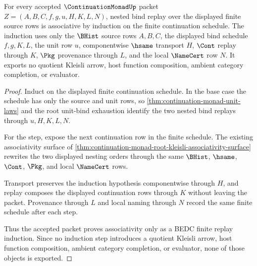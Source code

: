 \begin{theorem}
\label{thm:continuation-monad-bhist-bind-associativity-induction}
For every accepted $\ContinuationMonadUp$ packet $Z=(A,B,C,f,g,u,H,K,L,N)$, nested bind replay over the displayed finite source rows is associative by induction on the finite continuation schedule. The induction uses only the $\BHist$ source rows $A,B,C$, the displayed bind schedule $f,g,K,L$, the unit row $u$, componentwise $\hsame$ transport $H$, $\Cont$ replay through $K$, $\Pkg$ provenance through $L$, and the local $\NameCert$ row $N$. It exports no quotient Kleisli arrow, host function composition, ambient category completion, or evaluator.
\end{theorem}
\begin{proof}
Induct on the displayed finite continuation schedule. In the base case the schedule has only the source and unit rows, so \autoref{thm:continuation-monad-unit-laws} and the root unit-bind exhaustion identify the two nested bind replays through $u,H,K,L,N$.

For the step, expose the next continuation row in the finite schedule. The existing associativity surface of \autoref{thm:continuation-monad-root-kleisli-associativity-surface} rewrites the two displayed nesting orders through the same $\BHist$, $\hsame$, $\Cont$, $\Pkg$, and local $\NameCert$ rows.

Transport preserves the induction hypothesis componentwise through $H$, and replay composes the displayed continuation rows through $K$ without leaving the packet. Provenance through $L$ and local naming through $N$ record the same finite schedule after each step.

Thus the accepted packet proves associativity only as a BEDC finite replay induction. Since no induction step introduces a quotient Kleisli arrow, host function composition, ambient category completion, or evaluator, none of those objects is exported.
\end{proof}

